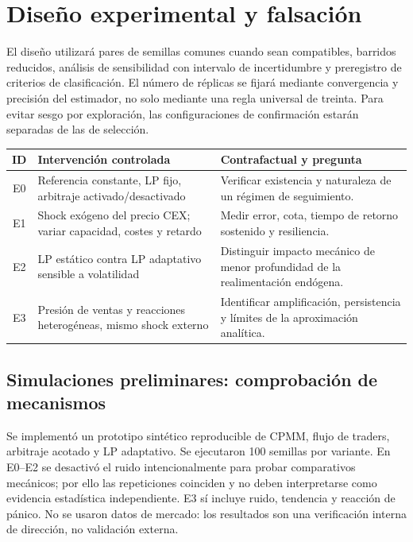 \section{Diseño experimental y falsación}

El diseño utilizará pares de semillas comunes cuando sean compatibles, barridos
reducidos, análisis de sensibilidad con intervalo de incertidumbre y preregistro de
criterios de clasificación. El número de réplicas se fijará mediante convergencia y
precisión del estimador, no solo mediante una regla universal de treinta. Para evitar
sesgo por exploración, las configuraciones de confirmación estarán separadas de las
de selección.

\begin{table}[!ht]
\centering
\small
\begin{tabularx}{\textwidth}{@{}c p{4.2cm} X@{}}
\toprule
\textbf{ID} & \textbf{Intervención controlada} & \textbf{Contrafactual y pregunta} \\
\midrule
E0 & Referencia constante, LP fijo, arbitraje activado/desactivado & Verificar existencia
  y naturaleza de un régimen de seguimiento. \\
E1 & Shock exógeno del precio CEX; variar capacidad, costes y retardo & Medir error, cota,
  tiempo de retorno sostenido y resiliencia. \\
E2 & LP estático contra LP adaptativo sensible a volatilidad & Distinguir impacto mecánico
  de menor profundidad de la realimentación endógena. \\
E3 & Presión de ventas y reacciones heterogéneas, mismo shock externo & Identificar
  amplificación, persistencia y límites de la aproximación analítica. \\
\bottomrule
\end{tabularx}
\end{table}

\subsection{Simulaciones preliminares: comprobación de mecanismos}

Se implementó un prototipo sintético reproducible de CPMM, flujo de traders, arbitraje
acotado y LP adaptativo. Se ejecutaron 100 semillas por variante. En E0--E2 se
desactivó el ruido intencionalmente para probar comparativos mecánicos; por ello las
repeticiones coinciden y no deben interpretarse como evidencia estadística
independiente. E3 sí incluye ruido, tendencia y reacción de pánico. No se usaron datos
de mercado: los resultados son una verificación interna de dirección, no validación
externa.

